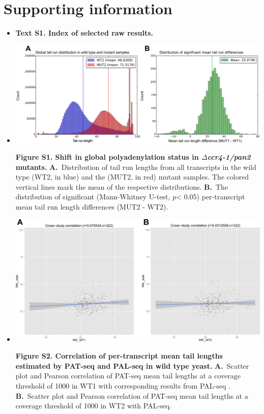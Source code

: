 \documentclass[10pt]{article}
\begin{document}
\section*{Supporting information}

\begin{itemize}


\item{\textbf{Text S1. Index of selected raw results.}}

\item[]{
\includegraphics[scale=0.8]{FigureS1.png}

\textbf{Figure S1. Shift in global polyadenylation status in \textit{$\Delta$ccr4-1/pan2} mutants.} \textbf{A.}~Distribution of tail run lengths from all transcripts in the wild type (WT2, in blue) and the (MUT2, in red) mutant samples. The colored vertical lines mark the mean of the respective distributions.
\textbf{B.}~The distribution of significant (Mann-Whitney U-test, $p$< 0.05) per-transcript mean tail run length differences (MUT2 - WT2).
}
	


\item[]{
\includegraphics[scale=0.8]{FigureS2.png}

\textbf{Figure S2. Correlation of per-transcript mean tail lengths estimated by PAT-seq and PAL-seq in wild type yeast.} \textbf{A.}~Scatter plot and Pearson correlation of PAT-seq mean tail lengths at a coverage threshold of 1000 in WT1 with corresponding results from PAL-seq \cite{subtelny14}. \textbf{B.}~Scatter plot and Pearson correlation of PAT-seq mean tail lengths at a coverage threshold of 1000 in WT2 with PAL-seq.}



\end{itemize}
\end{document}
